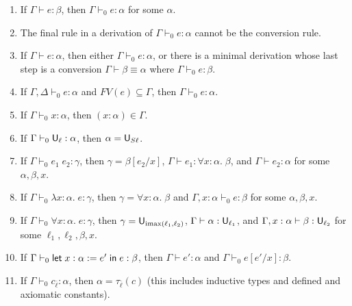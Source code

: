\begin{lemma}
\begin{enumerate}
\item If $\Gamma\vdash e:\beta$, then $\Gamma\vdash_0e:\alpha$ for some $\alpha$.
\item The final rule in a derivation of $\Gamma\vdash_0e:\alpha$ cannot be the conversion rule.
\item If $\Gamma\vdash e:\alpha$, then either $\Gamma\vdash_0 e:\alpha$, or there is a minimal derivation whose last step is a conversion $\Gamma\vdash\beta\equiv\alpha$ where $\Gamma\vdash_0e:\beta$.
\item If $\Gamma,\Delta\vdash_0e:\alpha$ and $FV(e)\subseteq\Gamma$, then $\Gamma\vdash_0e:\alpha$.
\item If $\Gamma\vdash_0x:\alpha$, then $(x:\alpha)\in\Gamma$.
\item If $\Gamma\vdash_0\U_\ell:\alpha$, then $\alpha=\mathsf{U}_{S\ell}$.
\item If $\Gamma\vdash_0 e_1\;e_2:\gamma$, then $\gamma=\beta[e_2/x]$, $\Gamma\vdash e_1:\forall x:\alpha.\;\beta$, and $\Gamma\vdash e_2:\alpha$ for some $\alpha,\beta,x$.
\item If $\Gamma\vdash_0 \lambda x:\alpha.\;e:\gamma$, then $\gamma=\forall x:\alpha.\;\beta$ and $\Gamma,x:\alpha\vdash_0 e:\beta$ for some $\alpha,\beta,x$.
\item If $\Gamma\vdash_0 \forall x:\alpha.\;e:\gamma$, then $\gamma=\mathsf{U}_{\operatorname{imax}(\ell_1,\ell_2)}$, $\Gamma\vdash \alpha:\U_{\ell_1}$, and $\Gamma,x:\alpha\vdash \beta:\U_{\ell_2}$ for some $\ell_1,\ell_2,\beta,x$.
\item If $\Gamma\vdash_0 \elet{x:\alpha:=e'}{e}:\beta$, then $\Gamma\vdash e':\alpha$ and $\Gamma\vdash_0 e[e'/x]:\beta$.
\item If $\Gamma\vdash_0 c_{\bar\ell}:\alpha$, then $\alpha=\tau_{\bar\ell}(c)$ (this includes inductive types and defined and axiomatic constants).
\end{enumerate}
\end{lemma}
